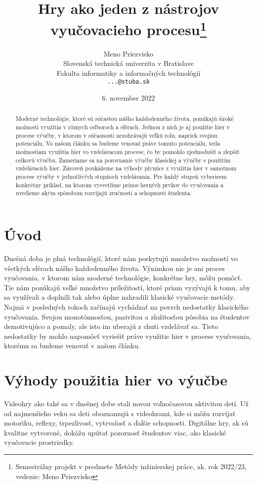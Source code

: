 \documentclass[10pt,twoside,slovak,a4paper]{article}
\title{Hry ako jeden z nástrojov vyučovacieho procesu\thanks{Semestrálny projekt v predmete Metódy inžinierskej práce, ak. rok 2022/23, vedenie: Meno Priezvisko}}
\author{Meno Priezvisko\\[2pt]
	{\small Slovenská technická univerzita v Bratislave}\\
	{\small Fakulta informatiky a informačných technológií}\\
	{\small \texttt{...@stuba.sk}}
	}
\date{\small 6. november 2022}
\begin{document}
\maketitle

\begin{abstract}

Moderné technológie, ktoré sú súčasťou nášho každodenného života, ponúkajú široké možnosti využitia v rôznych odboroch a sférach. Jednou z nich je aj použitie hier v procese výučby, v ktorom v súčasnosti nezohrávajú veľkú rolu, napriek svojmu potenciálu. Vo našom článku sa budeme venovať práve tomuto potenciálu, teda možnostiam využitia hier vo vzdelávacom procese, čo by pomohlo zjednodušiť a zlepšiť celkovú výučbu. Zameriame sa na porovnanie výučby klasickej a výučby s použitím vzdelávacích hier. Zároveň poukážeme na výhody plynúce z využitia hier v samotnom procese výučby v jednotlivých stupňoch vzdelávania. Pre každý stupeň vyberieem konkrétny príklad, na ktorom vysvetlíme prínos herných prvkov do vyučovania a uvedieme akým spôsobom rozvíjajú zručnosti a schopnosti študenta.

\end{abstract}



\section{Úvod}

Dnešná doba je plná technológií, ktoré nám poskytujú množstvo možností vo všetkých sférach nášho každodenného života. Výnimkou nie je ani proces vyučovania, v ktorom nám moderné technológie, konkrétne hry\cite{Zea2009-eh}, môžu pomôcť. Tie nám ponúkajú veľké množstvo príležitostí, ktoré priam vyzývajú k tomu, aby sa využívali a doplnili tak alebo úplne nahradili klasické vyučovacie metódy. Najmä v posledných rokoch začínajú vychádzať na povrch nedostatky klasického vyučovania. Svojou monotónnosťou, pasivitou a zložitosťou pôsobia na študentov demotivujúco a pomaly, ale isto im uberajú z chuti vzdelávať sa. Tieto nedostatky by mohlo napomôcť vyriešiť práve využitie hier v procese vyučovania, ktorému sa budeme venovať v našom článku. 

\section{Výhody použitia hier vo výučbe} \label{vyhody}

Videohry ako také sa v dnešnej dobe stali novou voľnočasovou aktivitou detí. Už od najmenšieho veku sa deti oboznamujú s videohrami, kde si môžu rozvíjať motoriku, reflexy, trpezlivosť, vytrvalosť a ďalšie schopnosti. Digitálne hry, ak sú kvalitne vytvorené, dokážu upútať pozornosť študentov viac, ako klasické vyučovacie prostriedky. 
\end{document}

